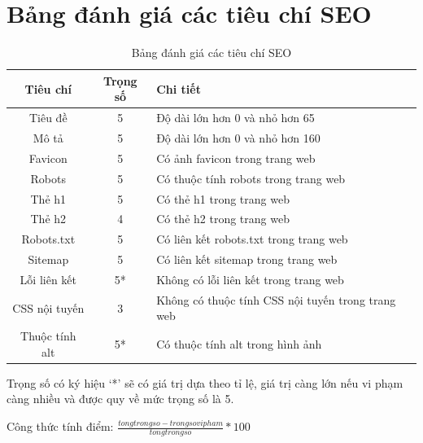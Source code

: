 \section{Bảng đánh giá các tiêu chí SEO}
\begin{table}[!ht]
	\centering
	\begin{tabular}{|c|c|l|}
		\hline
		\textbf{Tiêu chí} & \textbf{Trọng số} & \textbf{Chi tiết}\\
		\hline
		Tiêu đề & 5 & Độ dài lớn hơn 0 và nhỏ hơn 65\\
		\hline
		Mô tả & 5 & Độ dài lớn hơn 0 và nhỏ hơn 160\\
		\hline
		Favicon & 5 & Có ảnh favicon trong trang web\\
		\hline
		Robots & 5 & Có thuộc tính robots trong trang web\\
		\hline
		Thẻ h1 & 5 & Có thẻ h1 trong trang web\\
		\hline
		Thẻ h2 & 4 & Có thẻ h2 trong trang web\\
		\hline
		Robots.txt & 5 & Có liên kết robots.txt trong trang web\\
		\hline
		Sitemap & 5 & Có liên kết sitemap trong trang web\\
		\hline
		Lỗi liên kết & 5* & Không có lỗi liên kết trong trang web\\
		\hline
		CSS nội tuyến & 3 & Không có thuộc tính CSS nội tuyến trong trang web\\
		\hline
		Thuộc tính alt & 5* & Có thuộc tính alt trong hình ảnh\\
		\hline
	\end{tabular}
	\caption{Bảng đánh giá các tiêu chí SEO}
\end{table}
\par
Trọng số có ký hiệu `*' sẽ có giá trị dựa theo tỉ lệ, giá trị càng lớn nếu vi phạm càng nhiều và được quy về mức trọng số là 5.
\par
Công thức tính điểm: $\displaystyle\frac{tongtrongso - trongsovipham}{tongtrongso}*100$